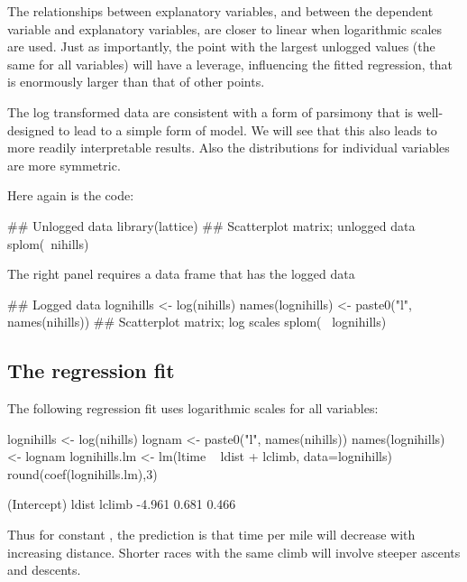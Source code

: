 The relationships between explanatory variables, and between the
dependent variable and explanatory variables, are closer to linear
when logarithmic scales are used.  Just as importantly, the point with
the largest unlogged values (the same for all variables) will have a
leverage, influencing the fitted regression, that is enormously larger
than that of other points.

The log transformed data are consistent with a form of parsimony that
is well-designed to lead to a simple form of model. We will see that
this also leads to more readily interpretable results.  Also the
distributions for individual variables are more symmetric.

Here again is the code:
\begin{Schunk}
\begin{Sinput}
## Unlogged data
library(lattice)
## Scatterplot matrix; unlogged data
splom(~nihills)
\end{Sinput}
\end{Schunk}

The right panel requires a data frame that has the logged data
\begin{Schunk}
\begin{Sinput}
## Logged data
lognihills <- log(nihills)
names(lognihills) <- paste0("l", names(nihills))
## Scatterplot matrix; log scales
splom(~ lognihills)
\end{Sinput}
\end{Schunk}

\subsection{The regression fit}

The following regression fit uses logarithmic scales for
all variables:

\begin{Schunk}
\begin{Sinput}
lognihills <- log(nihills)
lognam <- paste0("l", names(nihills))
names(lognihills) <- lognam
lognihills.lm <- lm(ltime ~ ldist + lclimb,
                    data=lognihills)
round(coef(lognihills.lm),3)
\end{Sinput}
\begin{Soutput}
(Intercept)       ldist      lclimb 
     -4.961       0.681       0.466 
\end{Soutput}
\end{Schunk}
\noindent
Thus for constant , the prediction is that time per mile
will decrease with increasing distance. Shorter races with the same climb
will involve steeper ascents and descents.

